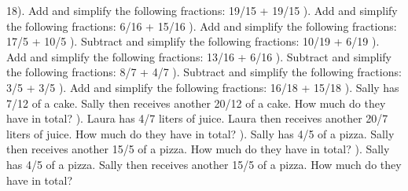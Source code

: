 \documentclass{article}%
\begin{document}
18). Add and simplify the following fractions: 19/15 + 19/15%
\newline%
\newline%
). Add and simplify the following fractions: 6/16 + 15/16%
\newline%
\newline%
). Add and simplify the following fractions: 17/5 + 10/5%
\newline%
\newline%
). Subtract and simplify the following fractions: 10/19 + 6/19%
\newline%
\newline%
). Add and simplify the following fractions: 13/16 + 6/16%
\newline%
\newline%
). Subtract and simplify the following fractions: 8/7 + 4/7%
\newline%
\newline%
). Subtract and simplify the following fractions: 3/5 + 3/5%
\newline%
\newline%
). Add and simplify the following fractions: 16/18 + 15/18%
\newline%
\newline%
). Sally has 7/12 of a cake. Sally then receives another 20/12 of a cake. How much do they have in total?%
\newline%
\newline%
). Laura has 4/7 liters of juice. Laura then receives another 20/7 liters of juice. How much do they have in total?%
\newline%
\newline%
). Sally has 4/5 of a pizza. Sally then receives another 15/5 of a pizza. How much do they have in total?%
\newline%
\newline%
). Sally has 4/5 of a pizza. Sally then receives another 15/5 of a pizza. How much do they have in total?%
\newline%
\end{document}
